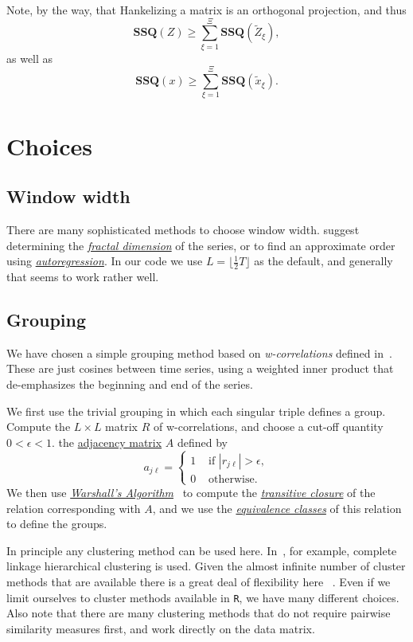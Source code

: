 \documentclass[11pt]{amsart}
\theoremstyle{plain}
\theoremstyle{definition}
\theoremstyle{remark}
\begin{document}
Note, by the way, that Hankelizing a matrix is an orthogonal projection, and thus
\[
\mathbf{SSQ}(Z)\geq\sum_{\xi=1}^\Xi\mathbf{SSQ}(\tilde Z_\xi),
\]
as well as
\[
\mathbf{SSQ}(x)\geq\sum_{\xi=1}^\Xi\mathbf{SSQ}(\tilde x_\xi).
\]

\section{Choices}
\subsection{Window width}
There are many sophisticated methods to choose window width. \citet[p. 18]{golyandina_nekrutkin_zhigljavsky_01} suggest determining the \href{http://en.wikipedia.org/wiki/Fractal_dimension}{\emph{fractal dimension}} of the series, or to find an approximate order using \href{http://en.wikipedia.org/wiki/Autoregressive_moving_average_model}{\emph{autoregression}}. In our code we use \(L=\lfloor\frac12 T\rfloor\) as the default, and generally that seems to work rather well. 
\subsection{Grouping}
We have chosen a simple grouping method based on \emph{w-correlations} defined in~\citet[p. 46--47]{golyandina_nekrutkin_zhigljavsky_01}. These are just cosines between time series, using a weighted inner product that de-emphasizes the beginning and end of the series. 

We
first use the trivial grouping in which each singular triple defines a group. Compute the \(L\times L\) matrix \(R\) of w-correlations, and choose a cut-off quantity \(0<\epsilon<1\). the \href{http://en.wikipedia.org/wiki/Modified_adjacency_matrix}{adjacency matrix} \(A\) defined by
\[
a_{j\ell}=\begin{cases}1&\text{ if }|r_{j\ell}|>\epsilon,\\
0&\text{ otherwise}.
\end{cases}
\]
We then use \href{http://en.wikipedia.org/wiki/Floyd-Warshall_algorithm}{\emph{Warshall's Algorithm}}~\citep{warshall_62} to compute the \href{http://en.wikipedia.org/wiki/Transitive_closure}{\emph{transitive closure}} of the relation corresponding with \(A\), and we use the \href{http://en.wikipedia.org/wiki/Equivalence_class}{\emph{equivalence classes}} of this relation to define the groups.

In principle any clustering method can be used here. In~\citet{bilancia_stea_08}, for example, complete linkage hierarchical clustering is used. Given the almost infinite number of cluster methods that are available there is a great deal of flexibility here~\citep{gan_ma_wu_07} . Even if we limit ourselves to cluster methods available in \texttt{R}, we have many different choices. Also note that there are many clustering methods that do not require pairwise similarity
measures first, and work directly on the data matrix.
\end{document}
